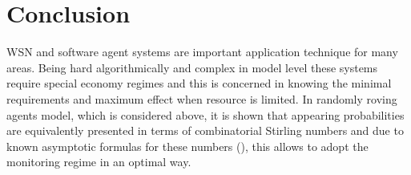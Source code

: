\documentclass[conference]{IEEEtran}
\begin{document}
\section{Conclusion}
WSN and software agent systems are important application technique for many areas. Being hard algorithmically and complex in model level these systems require special economy regimes and this is concerned in knowing the minimal requirements and maximum effect when resource is limited. In randomly roving agents model, which is considered above, it is shown that appearing probabilities are equivalently presented in terms of combinatorial Stirling numbers and due to known asymptotic formulas for these numbers (\cite{chelluri}), this allows to adopt the monitoring regime in an optimal way.




\end{document}
